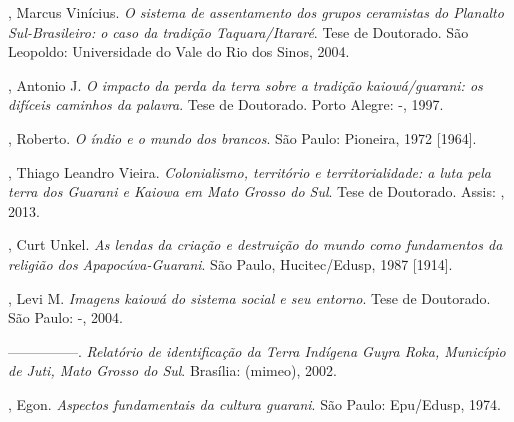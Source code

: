 \begin{Parskip}
, Marcus Vinícius. \emph{O sistema de assentamento dos grupos ceramistas
do Planalto Sul-Brasileiro: o caso da tradição Taquara/Itararé}. Tese de
Doutorado. São Leopoldo: Universidade do Vale do Rio dos Sinos, 2004.

, Antonio J. \emph{O impacto da perda da terra sobre a tradição
kaiowá/guarani: os difíceis caminhos da palavra}. Tese de Doutorado.
Porto Alegre: -, 1997.

  , Roberto. \emph{O índio e o mundo dos brancos}. São Paulo:
Pioneira, 1972 [1964].

, Thiago Leandro Vieira. \emph{Colonialismo, território e
territorialidade: a luta pela terra dos Guarani e Kaiowa em Mato Grosso
do Sul}. Tese de Doutorado. Assis: , 2013.

, Curt Unkel. \emph{As lendas da criação e destruição do mundo como
fundamentos da religião dos Apapocúva-Guarani}. São Paulo,
Hucitec/Edusp, 1987 [1914].

, Levi M. \emph{Imagens kaiowá do sistema social e seu entorno}. Tese de
Doutorado. São Paulo: -, 2004.

—————. \emph{Relatório de identificação da Terra Indígena Guyra Roka,
Município de Juti, Mato Grosso do Sul}. Brasília:  (mimeo), 2002.

, Egon. \emph{Aspectos fundamentais da cultura guarani}. São Paulo:
Epu/Edusp, 1974.
\end{Parskip}


